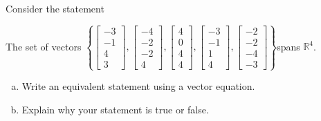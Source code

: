 
\begin{exerciseStatement}


Consider the statement 
\begin{center}\begin{minipage}{0.8\textwidth}
 The set of vectors \( \left\{ \left[\begin{array}{c}
-3 \\
-1 \\
4 \\
3
\end{array}\right] , \left[\begin{array}{c}
-4 \\
-2 \\
-2 \\
4
\end{array}\right] , \left[\begin{array}{c}
4 \\
0 \\
4 \\
4
\end{array}\right] , \left[\begin{array}{c}
-3 \\
-1 \\
1 \\
4
\end{array}\right] , \left[\begin{array}{c}
-2 \\
-2 \\
-4 \\
-3
\end{array}\right] \right\} \)spans \(\mathbb{R}^4\). 
\end{minipage}\end{center}
    


\begin{enumerate}[(a)]
\item  Write an equivalent statement using a vector equation.
\item  Explain why your statement is true or false.
\end{enumerate}
    
\end{exerciseStatement}
    
